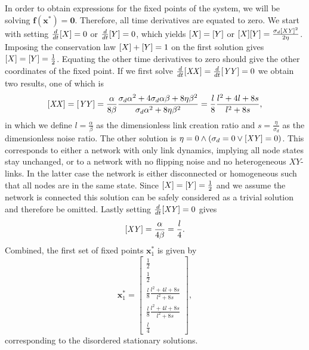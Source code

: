 In order to obtain expressions for the fixed points of the system, we will be solving $\bm{f}(\bm{x}^*)=\bm{0}$. Therefore, all time derivatives are equated to zero. We start with setting $\frac{d}{dt}[X] =0$ or $\frac{d}{dt}[Y]=0$, which yields $[X]=[Y]$ or $[X][Y]=\frac{\sigma_d \mathit{[XY]}^2}{2\eta}$. Imposing the conservation law $[X]+[Y]=1$ on the first solution gives $[X]=[Y]=\frac{1}{2}$. Equating the other time derivatives to zero should give the other coordinates of the fixed point. If we first solve $\frac{d}{dt}\mathit{[XX]}= \frac{d}{dt}\mathit{[YY]}=0$ we obtain two results, one of which is
\begin{equation}    
\mathit{[XX]}=\mathit{[YY]} = \frac{\alpha}{8\beta}\frac{ \sigma_d \alpha^2 +4\sigma_d \alpha \beta + 8\eta \beta^2 }{\sigma_d \alpha^2+8\eta \beta^2} = \frac{l}{8}\frac{l^2+4l+8s}{l^2+8s},
\end{equation}
in which we define $l=\frac{\alpha}{\beta}$ as the dimensionless link creation ratio and $s=\frac{\eta}{\sigma_d}$ as the dimensionless noise ratio. 
The other solution is $\eta = 0 \land \left( \sigma_d =0 \lor \mathit{[XY]}=0 \right)$. This corresponds to either a network with only link dynamics, implying all node states stay unchanged, or to a network with no flipping noise and no heterogeneous $XY$-links. In the latter case the network is either disconnected or homogeneous such that all nodes are in the same state. Since $[X]=[Y]=\frac{1}{2}$ and we assume the network is connected this solution can be safely considered as a trivial solution and therefore be omitted. 
Lastly setting $\frac{d}{dt}\mathit{[XY]}=0$ gives 
\begin{equation}
\mathit{[XY]} = \frac{\alpha}{4\beta} =\frac{l}{4}.
\end{equation}
Combined, the first set of fixed points $\bm{x}^*_1$ is given by 
\begin{equation}
\bm{x}^*_1 = 
\begin{bmatrix}
\frac{1}{2}\\[1ex]
\frac{1}{2}\\[1ex]
\frac{l}{8}\frac{l^2+4l+8s}{l^2+8s}\\[1ex]
\frac{l}{8}\frac{l^2+4l+8s}{l^2+8s}\\[1ex]
\frac{l}{4}
\end{bmatrix},
\end{equation}
corresponding to the disordered stationary solutions. 

